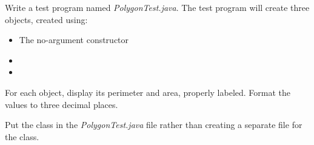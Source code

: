 \begin{exercise}
Write a test program named {\em PolygonTest.java}. The test program will create three  objects, created using:
\begin{itemize}
    \item The no-argument constructor
    \item {}
    \item {}
\end{itemize}

For each object, display its perimeter and area, properly labeled. Format the values to three decimal places.

Put the  class in the {\em PolygonTest.java} file rather than creating a separate file for the class. 
\end{exercise}


